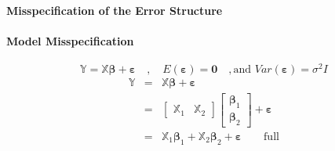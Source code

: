 \documentclass{article}
\begin{document}
\bigskip

\paragraph{Misspecification of the Error Structure}

\bigskip

\paragraph{Model Misspecification}

\begin{equation*}
\mathbb{Y}=\mathbb{X}\boldsymbol{\beta }+\boldsymbol{\varepsilon }\quad
,\quad E\left( \boldsymbol{\varepsilon }\right) =\boldsymbol{0}\quad ,\text{
and }Var\left( \boldsymbol{\varepsilon }\right) =\sigma ^{2}I
\end{equation*}%
\begin{eqnarray*}
\mathbb{Y} &=&\mathbb{X}\boldsymbol{\beta }+\boldsymbol{\varepsilon } \\
&=&\left[ 
\begin{array}{cc}
\mathbb{X}_{1} & \mathbb{X}_{2}%
\end{array}%
\right] \left[ 
\begin{array}{c}
\boldsymbol{\beta }_{1} \\ 
\boldsymbol{\beta }_{2}%
\end{array}%
\right] +\boldsymbol{\varepsilon } \\
&=&\mathbb{X}_{1}\boldsymbol{\beta }_{1}+\mathbb{X}_{2}\boldsymbol{\beta }%
_{2}+\boldsymbol{\varepsilon }\quad \quad \text{full}
\end{eqnarray*}

\bigskip
\end{document}
